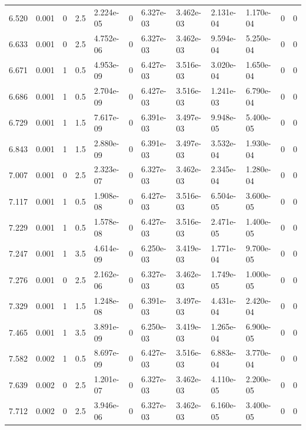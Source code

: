 \documentclass[preview]{standalone}
\begin{document}
{{{\begin{tabular}{L{1.2cm}C{1.2cm} C{0.3cm}C{0.5cm} C{1.4cm}C{1.4cm} C{1.4cm}C{1.4cm} C{1.6cm}C{1.6cm} C{1.6cm}C{1.6cm}}
  6.520  &  0.001  & 0     & 2.5 &  2.224e-05  & 0  &  6.327e-03&   3.462e-03& 2.131e-04 & 1.170e-04   &  0 & 0  \\ 
  6.633  &  0.001  & 0     & 2.5 &  4.752e-06  & 0  &  6.327e-03&   3.462e-03& 9.594e-04 & 5.250e-04   &  0 & 0  \\ 
  6.671  &  0.001  & 1     & 0.5 &  4.953e-09  & 0  &  6.427e-03&   3.516e-03& 3.020e-04 & 1.650e-04   &  0 & 0  \\ 
  6.686  &  0.001  & 1     & 0.5 &  2.704e-09  & 0  &  6.427e-03&   3.516e-03& 1.241e-03 & 6.790e-04   &  0 & 0  \\ 
  6.729  &  0.001  & 1     & 1.5 &  7.617e-09  & 0  &  6.391e-03&   3.497e-03& 9.948e-05 & 5.400e-05   &  0 & 0  \\ 
  6.843  &  0.001  & 1     & 1.5 &  2.880e-09  & 0  &  6.391e-03&   3.497e-03& 3.532e-04 & 1.930e-04   &  0 & 0  \\ 
  7.007  &  0.001  & 0     & 2.5 &  2.323e-07  & 0  &  6.327e-03&   3.462e-03& 2.345e-04 & 1.280e-04   &  0 & 0  \\ 
  7.117  &  0.001  & 1     & 0.5 &  1.908e-08  & 0  &  6.427e-03&   3.516e-03& 6.504e-05 & 3.600e-05   &  0 & 0  \\ 
  7.229  &  0.001  & 1     & 0.5 &  1.578e-08  & 0  &  6.427e-03&   3.516e-03& 2.471e-05 & 1.400e-05   &  0 & 0  \\ 
  7.247  &  0.001  & 1     & 3.5 &  4.614e-09  & 0  &  6.250e-03&   3.419e-03& 1.771e-04 & 9.700e-05   &  0 & 0  \\ 
  7.276  &  0.001  & 0     & 2.5 &  2.162e-06  & 0  &  6.327e-03&   3.462e-03& 1.749e-05 & 1.000e-05   &  0 & 0  \\ 
  7.329  &  0.001  & 1     & 1.5 &  1.248e-08  & 0  &  6.391e-03&   3.497e-03& 4.431e-04 & 2.420e-04   &  0 & 0  \\ 
  7.465  &  0.001  & 1     & 3.5 &  3.891e-09  & 0  &  6.250e-03&   3.419e-03& 1.265e-04 & 6.900e-05   &  0 & 0  \\ 
  7.582  &  0.002  & 1     & 0.5 &  8.697e-09  & 0  &  6.427e-03&   3.516e-03& 6.883e-04 & 3.770e-04   &  0 & 0  \\ 
  7.639  &  0.002  & 0     & 2.5 &  1.201e-07  & 0  &  6.327e-03&   3.462e-03& 4.110e-05 & 2.200e-05   &  0 & 0  \\ 
  7.712  &  0.002  & 0     & 2.5 &  3.946e-06  & 0  &  6.327e-03&   3.462e-03& 6.160e-05 & 3.400e-05   &  0 & 0  \\ 
\hline 
\end{tabular} 

}}}
\end{document}
